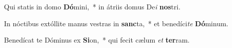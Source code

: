 \item Qui statis in domo \textbf{Dó}mini,~* in átriis domus De\textit{i} \textbf{nos}tri.
\item In nóctibus extóllite manus vestras in \textbf{sanc}ta,~* et benedíci\textit{te} \textbf{Dó}minum.
\item Benedícat te Dóminus ex \textbf{Si}on,~* qui fecit cælum \textit{et} \textbf{ter}ram.
